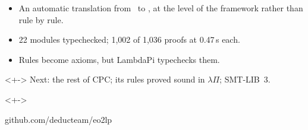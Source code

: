 \documentclass[handout, t, lualatex, compress, 11pt]{beamer}
\begin{document}
\begin{frame}{\secheader}%
	\begin{itemize}
		\item<+-> An automatic translation from \eoname\ to \lpname,
		      at the level of the framework rather than rule by rule.
		\item<+-> 22 modules typechecked; 1{,}002 of 1{,}036 proofs at
		      0.47\,s each.
		\item<+-> Rules become axioms, but LambdaPi typechecks them.
	\end{itemize}
	\begin{uncoverenv}<+->
		\gap
		Next: the rest of CPC; its rules proved sound in $λΠ$;
		SMT-LIB~3.
	\end{uncoverenv}
	\begin{uncoverenv}<+->
		\gap
		\begin{center}
			\lpmono\normalsize github.com/deducteam/eo2lp
		\end{center}
	\end{uncoverenv}
\end{frame}
\end{document}
